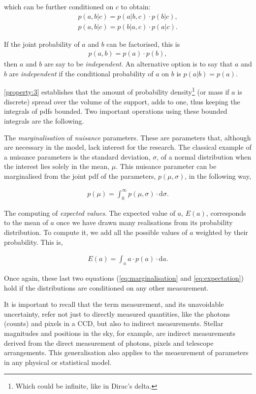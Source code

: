 which can be further conditioned on $c$ to obtain:
\begin{align}
\label{eq:conditioned}
p(a,b|c)=p(a|b,c)\cdot p(b|c),\nonumber \\
p(a,b|c)=p(b|a,c) \cdot p(a|c).
\end{align}

If the joint probability of $a$ and $b$ can be factorised, this is
\begin{align}
p(a,b)=p(a)\cdot p(b),
\end{align}
then $a$ and $b$ are say to be \emph{independent}. An alternative option is to say that $a$ and $b$ are \emph{independent} if the conditional probability of $a$ on $b$ is $p(a|b)=p(a)$.


\ref{property:3} establishes that the amount of probability density\footnote{Which could be infinite, like in Dirac's delta.} (or mass if $a$ is discrete) spread over the volume of the support, adds to one, thus keeping the integrals of \glspl{pdf} bounded. Two important operations using these bounded integrals are the following.


The \emph{marginalisation} of \emph{nuisance} parameters. These are parameters that, although are necessary in the model, lack interest for the research. The classical example of a nuisance parameters is the standard deviation, $\sigma$, of a normal distribution when the interest lies solely in the mean, $\mu$. This nuisance parameter can be marginalised from the joint \gls{pdf} of the parameters, $p(\mu,\sigma)$, in the following way,

\begin{align}
\label{eq:marginalisation}
p(\mu)=\int_0^{\infty} p(\mu,\sigma)\cdot \mathrm{d}\sigma.
\end{align}

The computing of \emph{expected values}. The expected value of $a$, $E(a)$, corresponds to the mean of $a$ once we have drawn many realisations from its probability distribution. To compute it, we add all the possible values of $a$ weighted by their probability. This is,

\begin{align}
\label{eq:expectation}
E(a)=\int_a a\cdot p(a)\cdot \mathrm{d}a.
\end{align}

Once again, these last two equations (\ref{eq:marginalisation} and \ref{eq:expectation}) hold if the distributions are conditioned on any other measurement.

It is important to recall that the term measurement, and its unavoidable uncertainty, refer not just to directly measured quantities, like the photons (counts) and pixels in a CCD, but also to indirect measurements. Stellar magnitudes and positions in the sky, for example, are indirect measurements derived from the direct measurement of photons, pixels and telescope arrangements. This generalisation also applies to the measurement of parameters in any physical or statistical model.%



